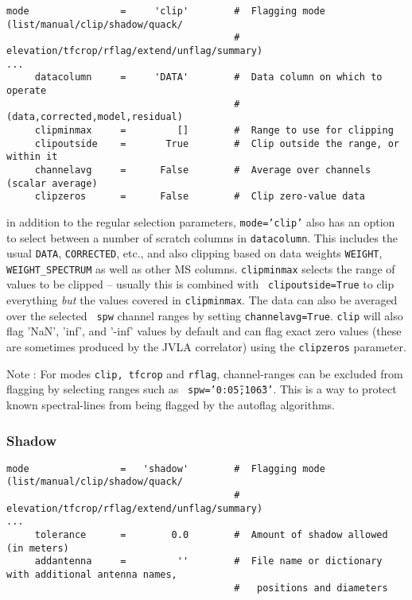 \small
\begin{verbatim}
mode                =     'clip'        #  Flagging mode (list/manual/clip/shadow/quack/
                                        #  elevation/tfcrop/rflag/extend/unflag/summary)
...
     datacolumn     =     'DATA'        #  Data column on which to operate
                                        #   (data,corrected,model,residual)
     clipminmax     =         []        #  Range to use for clipping
     clipoutside    =       True        #  Clip outside the range, or within it
     channelavg     =      False        #  Average over channels (scalar average)
     clipzeros      =      False        #  Clip zero-value data
\end{verbatim}
\normalsize

in addition to the regular selection parameters, {\tt mode='clip'}
also has an option to select between a number of scratch columns in
{\tt datacolumn}. This includes the usual {\tt DATA}, {\tt CORRECTED},
etc., and also clipping based on data weights {\tt WEIGHT}, {\tt
  WEIGHT\_SPECTRUM} as well as other MS columns. {\tt clipminmax} selects the
range of values to be clipped -- usually this is combined with {\tt
  clipoutside=True} to clip everything {\it but} the values covered in
{\tt clipminmax}. The data can also be averaged over the selected {\tt
  spw} channel ranges by setting {\tt channelavg=True}. {\tt clip}
will also flag 'NaN', 'inf', and '-inf' values by default and can flag
exact zero values (these are sometimes produced by the JVLA
correlator) using the {\tt clipzeros} parameter.


Note : For modes {\tt clip, tfcrop} and {\tt rflag}, channel-ranges
can be excluded from flagging by selecting ranges such as {\tt
  spw='0:0\~5;10\~63'}. This is a way to protect known spectral-lines
from being flagged by the autoflag algorithms.


\subsubsection{Shadow}
\label{section:edit.flagdata.mode.shadow}

\small
\begin{verbatim}
mode                =   'shadow'        #  Flagging mode (list/manual/clip/shadow/quack/
                                        #  elevation/tfcrop/rflag/extend/unflag/summary)
...
     tolerance      =        0.0        #  Amount of shadow allowed (in meters)
     addantenna     =         ''        #  File name or dictionary with additional antenna names,
                                        #   positions and diameters
\end{verbatim}

